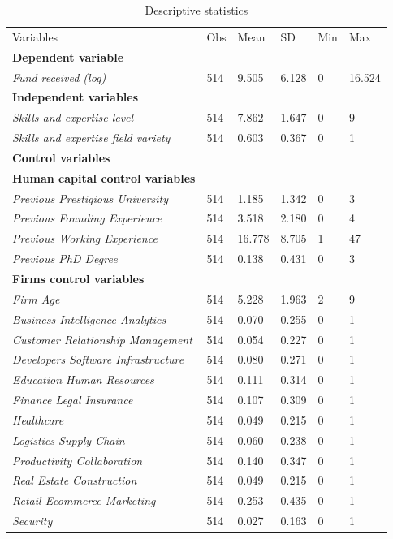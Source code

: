 \documentclass[12pt]{article}
\begin{document}
\begin{table} [ht]
\caption{Descriptive statistics}
\scriptsize
\renewcommand{\arraystretch}{1.5}
\begin{tabularx}{\textwidth}{ p{4.9cm} p{1.6cm} p{1.6cm} p{1.6cm} p{1.6cm} p{1.6cm} }
\toprule
\multicolumn{1}{l}{Variables}&\multicolumn{1}{l}{Obs}&\multicolumn{1}{l}{Mean}&\multicolumn{1}{l}{SD}&\multicolumn{1}{l}{Min}&\multicolumn{1}{l}{Max} \\
\cmidrule(r){1-6}
\textbf{Dependent variable} & & & & & \\
\textit{Fund received (log)} & 514 & 9.505 & 6.128 & 0 & 16.524 \\
\cmidrule(r){1-6}
\textbf{Independent variables} & & & & & \\
\textit{Skills and expertise level} & 514 & 7.862 & 1.647 & 0 & 9 \\
\textit{Skills and expertise field variety} & 514 & 0.603 & 0.367 & 0 & 1 \\
\cmidrule(r){1-6}\textbf{Control variables} & & & & & \\
\textbf{Human capital control variables} & & & & & \\
\textit{Previous Prestigious University} & 514 & 1.185 & 1.342 & 0 & 3 \\
\textit{Previous Founding Experience} & 514 & 3.518 & 2.180 & 0 & 4 \\
\textit{Previous Working Experience} & 514 & 16.778 & 8.705 & 1 & 47 \\
\textit{Previous PhD Degree} & 514 & 0.138 & 0.431 & 0 & 3 \\
\cmidrule(r){1-6}
\textbf{Firms control variables} & & & & & \\
\textit{Firm Age} & 514 & 5.228 & 1.963 & 2 & 9 \\
\textit{Business Intelligence Analytics} & 514 & 0.070 & 0.255 & 0 & 1 \\
\textit{Customer Relationship Management} & 514 & 0.054 & 0.227 & 0 & 1 \\
\textit{Developers Software Infrastructure} & 514 & 0.080 & 0.271 & 0 & 1 \\
\textit{Education Human Resources} & 514 & 0.111 & 0.314 & 0 & 1 \\
\textit{Finance Legal Insurance} & 514 & 0.107 & 0.309 & 0 & 1 \\
\textit{Healthcare} & 514 & 0.049 & 0.215 & 0 & 1 \\
\textit{Logistics Supply Chain} & 514 & 0.060 & 0.238 & 0 & 1 \\
\textit{Productivity Collaboration} & 514 & 0.140 & 0.347 & 0 & 1 \\
\textit{Real Estate Construction} & 514 & 0.049 & 0.215 & 0 & 1 \\
\textit{Retail Ecommerce Marketing} & 514 & 0.253 & 0.435 & 0 & 1 \\
\textit{Security} & 514 & 0.027 & 0.163 & 0 & 1 \\
\midrule
\end{tabularx}
\label{table4}
\end{table}
\end{document}

